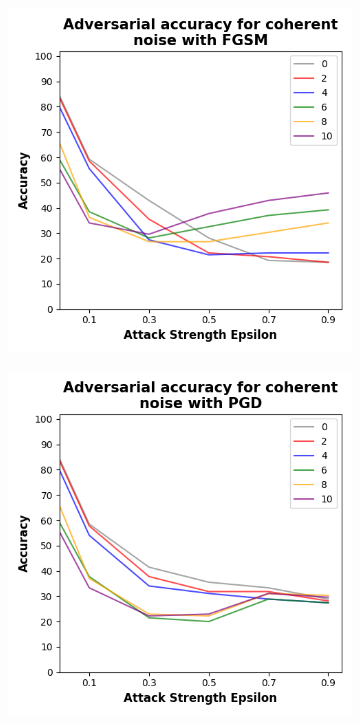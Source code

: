 \begin{figure}[!h]
  \centering

  \begin{subfigure}{0.45\textwidth}
      \includegraphics[width=\linewidth]{figures/evaluation_results/breast-cancer/pqc/figures/coherent-fgsm.png}
      \label{fig:bc9}
  \end{subfigure} \qquad
  \begin{subfigure}{0.45\textwidth}
      \includegraphics[width=\linewidth]{figures/evaluation_results/breast-cancer/pqc/figures/coherent-pgd.png}

\end{subfigure}
\end{figure}
